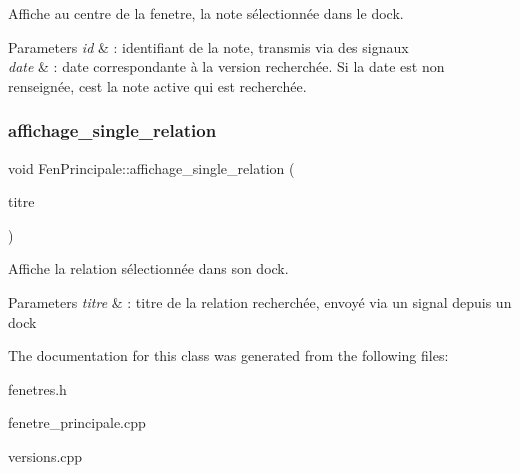 Affiche au centre de la fenetre, la note sélectionnée dans le dock. 


\begin{DoxyParams}{Parameters}
{\em id} & \+: identifiant de la note, transmis via des signaux \\
\hline
{\em date} & \+: date correspondante à la version recherchée. Si la date est non renseignée, c\textquotesingle{}est la note active qui est recherchée. \\
\hline
\end{DoxyParams}
\mbox{\label{class_fen_principale_a67e142066003277638ed8b7dc67b19e9}} 
\subsubsection{\texorpdfstring{affichage\+\_\+single\+\_\+relation}{affichage\_single\_relation}}
{\footnotesize\ttfamily void Fen\+Principale\+::affichage\+\_\+single\+\_\+relation (\begin{DoxyParamCaption}\item[{Q\+String}]{titre }\end{DoxyParamCaption})\hspace{0.3cm}{\ttfamily [slot]}}



Affiche la relation sélectionnée dans son dock. 


\begin{DoxyParams}{Parameters}
{\em titre} & \+: titre de la relation recherchée, envoyé via un signal depuis un dock \\
\hline
\end{DoxyParams}


The documentation for this class was generated from the following files\+:\begin{DoxyCompactItemize}
\item 
fenetres.\+h\item 
fenetre\+\_\+principale.\+cpp\item 
versions.\+cpp\end{DoxyCompactItemize}
